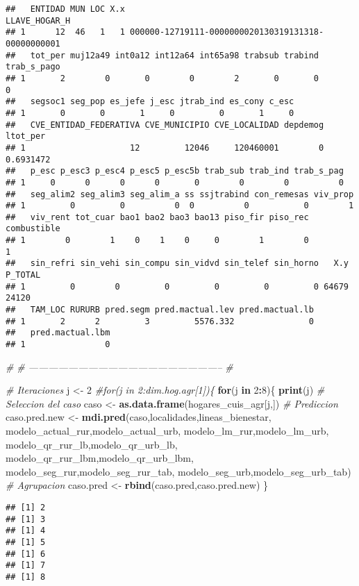 \documentclass[11pt,]{article}
\newenvironment{Shaded}{\begin{snugshade}}{\end{snugshade}}
\newcommand{\KeywordTok}[1]{\textcolor[rgb]{0.13,0.29,0.53}{\textbf{#1}}}
\newcommand{\DecValTok}[1]{\textcolor[rgb]{0.00,0.00,0.81}{#1}}
\newcommand{\StringTok}[1]{\textcolor[rgb]{0.31,0.60,0.02}{#1}}
\newcommand{\CommentTok}[1]{\textcolor[rgb]{0.56,0.35,0.01}{\textit{#1}}}
\newcommand{\ControlFlowTok}[1]{\textcolor[rgb]{0.13,0.29,0.53}{\textbf{#1}}}
\newcommand{\OperatorTok}[1]{\textcolor[rgb]{0.81,0.36,0.00}{\textbf{#1}}}
\newcommand{\NormalTok}[1]{#1}
\begin{document}
\begin{verbatim}
##   ENTIDAD MUN LOC X.x                                      LLAVE_HOGAR_H
## 1      12  46   1   1 000000-12719111-0000000020130319131318-00000000001
##   tot_per muj12a49 int0a12 int12a64 int65a98 trabsub trabind trab_s_pago
## 1       2        0       0        0        2       0       0           0
##   segsoc1 seg_pop es_jefe j_esc jtrab_ind es_cony c_esc
## 1       0       0       1     0         0       1     0
##   CVE_ENTIDAD_FEDERATIVA CVE_MUNICIPIO CVE_LOCALIDAD depdemog  ltot_per
## 1                     12         12046     120460001        0 0.6931472
##   p_esc p_esc3 p_esc4 p_esc5 p_esc5b trab_sub trab_ind trab_s_pag
## 1     0      0      0      0       0        0        0          0
##   seg_alim2 seg_alim3 seg_alim_a ss ssjtrabind con_remesas viv_prop
## 1         0         0          0  0          0           0        1
##   viv_rent tot_cuar bao1 bao2 bao3 bao13 piso_fir piso_rec combustible
## 1        0        1    0    1    0     0        1        0           1
##   sin_refri sin_vehi sin_compu sin_vidvd sin_telef sin_horno   X.y P_TOTAL
## 1         0        0         0         0         0         0 64679   24120
##   TAM_LOC RURURB pred.segm pred.mactual.lev pred.mactual.lb
## 1       2      2         3         5576.332               0
##   pred.mactual.lbm
## 1                0
\end{verbatim}

\begin{Shaded}
\begin{Highlighting}[]
\CommentTok{#}
\CommentTok{# -----------------------------------------------------------}
\CommentTok{#}

\CommentTok{# Iteraciones}
\NormalTok{j <-}\StringTok{ }\DecValTok{2}
\CommentTok{#for(j in 2:dim.hog.agr[1])\{}
 \ControlFlowTok{for}\NormalTok{(j }\ControlFlowTok{in} \DecValTok{2}\OperatorTok{:}\DecValTok{8}\NormalTok{)\{}
  \KeywordTok{print}\NormalTok{(j)}
  \CommentTok{# Seleccion del caso}
\NormalTok{  caso <-}\StringTok{ }\KeywordTok{as.data.frame}\NormalTok{(hogares_cuis_agr[j,])}
  \CommentTok{# Prediccion}
\NormalTok{  caso.pred.new <-}\StringTok{ }\KeywordTok{mdi.pred}\NormalTok{(caso,localidades,lineas_bienestar,}
\NormalTok{                            modelo_actual_rur,modelo_actual_urb, }
\NormalTok{                            modelo_lm_rur,modelo_lm_urb,}
\NormalTok{                            modelo_qr_rur_lb,modelo_qr_urb_lb, }
\NormalTok{                            modelo_qr_rur_lbm,modelo_qr_urb_lbm,}
\NormalTok{                            modelo_seg_rur,modelo_seg_rur_tab,}
\NormalTok{                            modelo_seg_urb,modelo_seg_urb_tab)}
  \CommentTok{# Agrupacion}
\NormalTok{  caso.pred <-}\StringTok{ }\KeywordTok{rbind}\NormalTok{(caso.pred,caso.pred.new)}
\NormalTok{\}}
\end{Highlighting}
\end{Shaded}

\begin{verbatim}
## [1] 2
## [1] 3
## [1] 4
## [1] 5
## [1] 6
## [1] 7
## [1] 8
\end{verbatim}




\newpage
\singlespacing 
\end{document}
